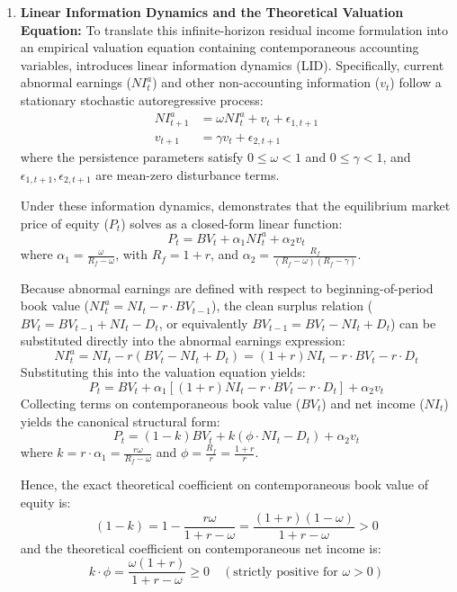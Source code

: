 \begin{enumerate}
\item \textbf{Linear Information Dynamics and the Theoretical Valuation Equation:}
To translate this infinite-horizon residual income formulation into an empirical valuation equation containing contemporaneous accounting variables, \citet{ohlson1995} introduces linear information dynamics (LID). Specifically, current abnormal earnings ($NI_t^a$) and other non-accounting information ($v_t$) follow a stationary stochastic autoregressive process:
\begin{align}
NI_{t+1}^a &= \omega NI_t^a + v_t + \epsilon_{1,t+1} \\
v_{t+1} &= \gamma v_t + \epsilon_{2,t+1}
\end{align}
where the persistence parameters satisfy $0 \le \omega < 1$ and $0 \le \gamma < 1$, and $\epsilon_{1,t+1}, \epsilon_{2,t+1}$ are mean-zero disturbance terms.

Under these information dynamics, \citet{ohlson1995} demonstrates that the equilibrium market price of equity ($P_t$) solves as a closed-form linear function:
\begin{equation}
P_t = BV_t + \alpha_1 NI_t^a + \alpha_2 v_t
\end{equation}
where $\alpha_1 = \frac{\omega}{R_f - \omega}$, with $R_f = 1 + r$, and $\alpha_2 = \frac{R_f}{(R_f - \omega)(R_f - \gamma)}$.

Because abnormal earnings are defined with respect to beginning-of-period book value ($NI_t^a = NI_t - r \cdot BV_{t-1}$), the clean surplus relation ($BV_t = BV_{t-1} + NI_t - D_t$, or equivalently $BV_{t-1} = BV_t - NI_t + D_t$) can be substituted directly into the abnormal earnings expression:
\begin{equation}
NI_t^a = NI_t - r(BV_t - NI_t + D_t) = (1 + r)NI_t - r \cdot BV_t - r \cdot D_t
\end{equation}
Substituting this into the valuation equation yields:
\begin{equation}
P_t = BV_t + \alpha_1 \left[(1 + r)NI_t - r \cdot BV_t - r \cdot D_t\right] + \alpha_2 v_t
\end{equation}
Collecting terms on contemporaneous book value ($BV_t$) and net income ($NI_t$) yields the canonical structural form:
\begin{equation}
P_t = (1 - k) BV_t + k (\phi \cdot NI_t - D_t) + \alpha_2 v_t
\end{equation}
where $k = r \cdot \alpha_1 = \frac{r \omega}{R_f - \omega}$ and $\phi = \frac{R_f}{r} = \frac{1+r}{r}$.

Hence, the exact theoretical coefficient on contemporaneous book value of equity is:
\begin{equation}
(1 - k) = 1 - \frac{r \omega}{1 + r - \omega} = \frac{(1 + r)(1 - \omega)}{1 + r - \omega} > 0
\end{equation}
and the theoretical coefficient on contemporaneous net income is:
\begin{equation}
k \cdot \phi = \frac{\omega(1 + r)}{1 + r - \omega} \ge 0 \quad (\text{strictly positive for } \omega > 0)
\end{equation}


\end{enumerate}
